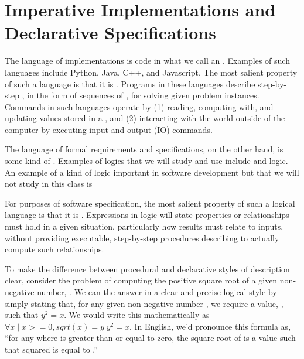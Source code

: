 \documentclass[letterpaper,10pt,english]{sphinxmanual}
\begin{document}
\section{Imperative Implementations and Declarative Specifications}
\label{\detokenize{02-logic-and-code:imperative-implementations-and-declarative-specifications}}
The language of implementations is code in what we call an . Examples of such languages include Python,
Java, C++, and Javascript. The most salient property of such a
language is that it is . Programs in these languages
describe step-by-step , in the form of sequences of
, for solving given problem instances. Commands in such
languages operate by (1) reading, computing with, and updating values
stored in a , and (2) interacting with the world
outside of the computer by executing input and output (IO) commands.

The language of formal requirements and specifications, on the other
hand, is some kind of . Examples of logics that we
will study and use include  and  logic.  An
example of a kind of logic important in software development but that
we will not study in this class is 

For purposes of software specification, the most salient property of
such a logical language is that it is .  Expressions in
logic will state  properties or relationships must hold in a
given situation, particularly how results must relate to inputs,
without providing executable, step-by-step procedures describing 
to actually compute such relationships.

To make the difference between procedural and declarative styles of
description clear, consider the problem of computing the positive
square root of a given non-negative number, . We can  the
answer in a clear and precise logical style by simply stating that,
for any given non-negative number , we require a value, , such
that \(y^2 = x\). We would write this mathematically as
\(\forall x \mid x >= 0, sqrt(x) = y | y^2 = x\). In English, we’d
pronounce this formula as, “for any  where  is greater than or
equal to zero, the square root of  is a value  such that 
squared is equal to .”
\end{document}
